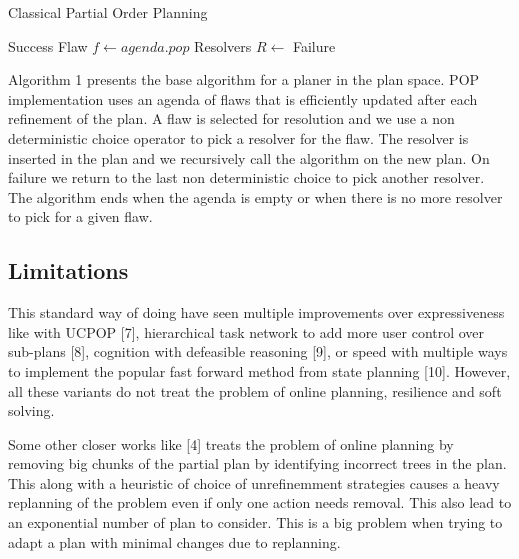 \documentclass[]{article}
\begin{document}
\begin{algorithm}\caption{Classical Partial Order Planning}\label{pop}\begin{algorithmic}[1]

\State {} 
 \State \Return Success
 \EndIf
    \State Flaw \(f\gets agenda.pop\)
 \State Resolvers \(R \gets\)
 
 
\State {} 
\State {}
\Else 
            \State {} \EndIf
    \EndFor
    \State \Return Failure 
\EndFunction

\end{algorithmic}\end{algorithm}

Algorithm 1 presents the base algorithm for a planer in the plan space.
POP implementation uses an agenda of flaws that is efficiently updated
after each refinement of the plan. A flaw is selected for resolution and
we use a non deterministic choice operator to pick a resolver for the
flaw. The resolver is inserted in the plan and we recursively call the
algorithm on the new plan. On failure we return to the last non
deterministic choice to pick another resolver. The algorithm ends when
the agenda is empty or when there is no more resolver to pick for a
given flaw.

\subsection{Limitations}\label{limitations}

This standard way of doing have seen multiple improvements over
expressiveness like with UCPOP {[}7{]}, hierarchical task network to add
more user control over sub-plans {[}8{]}, cognition with defeasible
reasoning {[}9{]}, or speed with multiple ways to implement the popular
fast forward method from state planning {[}10{]}. However, all these
variants do not treat the problem of online planning, resilience and
soft solving.

Some other closer works like {[}4{]} treats the problem of online
planning by removing big chunks of the partial plan by identifying
incorrect trees in the plan. This along with a heuristic of choice of
unrefinemment strategies causes a heavy replanning of the problem even
if only one action needs removal. This also lead to an exponential
number of plan to consider. This is a big problem when trying to adapt a
plan with minimal changes due to replanning.
\end{document}
